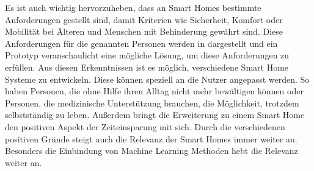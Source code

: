 Es ist auch wichtig hervorzuheben, dass an Smart Homes bestimmte Anforderungen gestellt sind, damit Kriterien wie Sicherheit, Komfort oder Mobilität bei Älteren und Menschen mit Behinderung gewährt sind. Diese Anforderungen für die genannten Personen werden in \citep{das2015design} dargestellt und ein Prototyp veranschaulicht eine mögliche Lösung, um diese Anforderungen zu erfüllen. Aus diesen Erkenntnissen ist es möglich, verschiedene Smart Home Systeme zu entwickeln. Diese können speziell an die Nutzer angepasst werden. So haben Personen, die ohne Hilfe ihren Alltag nicht mehr bewältigen können oder Personen, die medizinische Unterstützung brauchen, die Möglichkeit, trotzdem selbstständig zu leben. Außerdem bringt die Erweiterung zu einem Smart Home den positiven Aspekt der Zeiteinsparung mit sich. Durch die verschiedenen positiven Gründe steigt auch die Relevanz der Smart Homes immer weiter an. Besonders die Einbindung von Machine Learning Methoden hebt die Relevanz weiter an.

